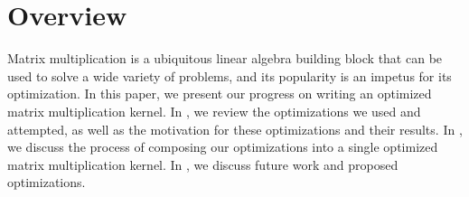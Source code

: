 
\section{Overview}
Matrix multiplication is a ubiquitous linear algebra building block that can be
used to solve a wide variety of problems, and its popularity is an impetus for
its optimization. In this paper, we present our progress on writing an
optimized matrix multiplication kernel. In , we review the
optimizations we used and attempted, as well as the motivation for these
optimizations and their results. In , we discuss the process
of composing our optimizations into a single optimized matrix multiplication
kernel. In , we discuss future work and proposed optimizations.
